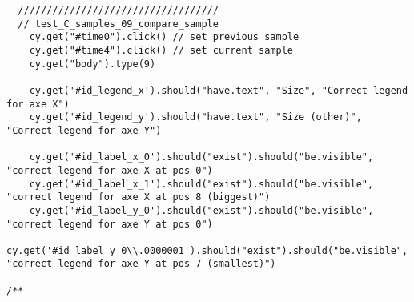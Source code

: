 \begin{verbatim}
  ///////////////////////////////////
  // test_C_samples_09_compare_sample
    cy.get("#time0").click() // set previous sample
    cy.get("#time4").click() // set current sample
    cy.get("body").type(9)

    cy.get('#id_legend_x').should("have.text", "Size", "Correct legend for axe X")
    cy.get('#id_legend_y').should("have.text", "Size (other)", "Correct legend for axe Y")

    cy.get('#id_label_x_0').should("exist").should("be.visible", "correct legend for axe X at pos 0")
    cy.get('#id_label_x_1').should("exist").should("be.visible", "correct legend for axe X at pos 8 (biggest)")
    cy.get('#id_label_y_0').should("exist").should("be.visible", "correct legend for axe Y at pos 0")
    cy.get('#id_label_y_0\\.0000001').should("exist").should("be.visible", "correct legend for axe Y at pos 7 (smallest)")

/**
\end{verbatim}

